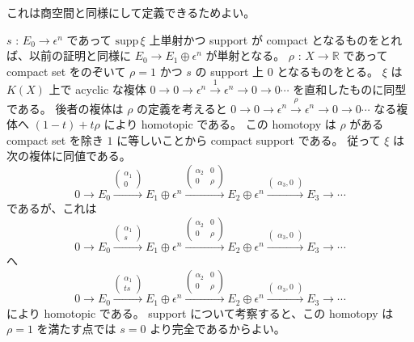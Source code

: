 \documentclass[dvipdfmx]{jsarticle}
\begin{document}
\begin{Proof}
\itemprof
  これは商空間と同様にして定義できるためよい。
\end{Proof}

\begin{Proof}
\itemprof
  \(s\) : \(E_0 \to \epsilon^n\) であって \(\text{supp} \, \xi\) 上単射かつ support が compact となるものをとれば、以前の証明と同様に \(E_0 \to E_1 \oplus \epsilon^n\) が単射となる。
  \(\rho\) : \(X \to \mathbb{R}\) であって compact set をのぞいて \(\rho = 1\) かつ \(s\) の support 上 \(0\) となるものをとる。
  \(\xi\) は \(K(X)\) 上で acyclic な複体 \(0 \to 0 \to \epsilon^n \overset{1}{\to} \epsilon^n \to 0 \to 0 \cdots\) を直和したものに同型である。
  後者の複体は \(\rho\) の定義を考えると \(0 \to 0 \to \epsilon^n \overset{\rho}{\to} \epsilon^n \to 0 \to 0 \cdots\) なる複体へ \((1 - t) + t \rho\) により homotopic である。
  この homotopy は \(\rho\) がある compact set を除き \(1\) に等しいことから compact support である。
  従って \(\xi\) は次の複体に同値である。
  \[0 \to E_0 \overset{
    \begin{pmatrix}
      \alpha_1 \\
      0
    \end{pmatrix}
  }{\to} E_1 \oplus \epsilon^n \overset{
    \begin{pmatrix}
      \alpha_2 & 0 \\
      0 & \rho
    \end{pmatrix}
  }{\to} E_2 \oplus \epsilon^n \overset{
    \begin{pmatrix}
      \alpha_3 , 0
    \end{pmatrix}
  }{\to} E_3 \to \cdots\]
  であるが、これは
  \[0 \to E_0 \overset{
    \begin{pmatrix}
      \alpha_1 \\
      s
    \end{pmatrix}
  }{\to} E_1 \oplus \epsilon^n \overset{
    \begin{pmatrix}
      \alpha_2 & 0 \\
      0 & \rho
    \end{pmatrix}
  }{\to} E_2 \oplus \epsilon^n \overset{
    \begin{pmatrix}
      \alpha_3 , 0
    \end{pmatrix}
  }{\to} E_3 \to \cdots\]
  へ
  \[0 \to E_0 \overset{
    \begin{pmatrix}
      \alpha_1 \\
      t s
    \end{pmatrix}
  }{\to} E_1 \oplus \epsilon^n \overset{
    \begin{pmatrix}
      \alpha_2 & 0 \\
      0 & \rho
    \end{pmatrix}
  }{\to} E_2 \oplus \epsilon^n \overset{
    \begin{pmatrix}
      \alpha_3 , 0
    \end{pmatrix}
  }{\to} E_3 \to \cdots\]
  により homotopic である。
  support について考察すると、この homotopy は \(\rho = 1\) を満たす点では \(s = 0\) より完全であるからよい。
\end{Proof}
\end{document}
